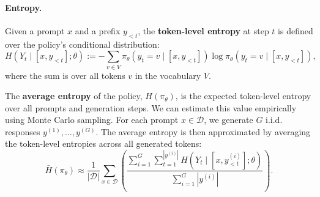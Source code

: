 \paragraph{Entropy.} 
%
Given a prompt $x$ and a prefix $y_{<t}$, the \textbf{token-level entropy} at step $t$ is defined over the policy's conditional distribution:
$$
H(Y_t \mid [x, y_{<t}]; \theta) := -\sum_{v \in V} \pi_\theta(y_t = v \mid [x, y_{<t}]) \log \pi_\theta(y_t = v \mid [x, y_{<t}]),
$$
where the sum is over all tokens $v$ in the vocabulary $V$.

The \textbf{average entropy} of the policy, $H(\pi_\theta)$, is the expected token-level entropy over all prompts and generation steps. We can estimate this value empirically using Monte Carlo sampling. For each prompt $x \in \mathcal{D}$, we generate $G$ i.i.d. responses $y^{(1)}, \dots, y^{(G)}$. The average entropy is then approximated by averaging the token-level entropies across all generated tokens:
$$
\bar{H}(\pi_\theta) \approx \frac{1}{|\mathcal{D}|} \sum_{x \in \mathcal{D}} \left( \frac{\sum_{i=1}^G \sum_{t=1}^{|y^{(i)}|} H(Y_t \mid [x, y^{(i)}_{<t}]; \theta)}{\sum_{i=1}^G |y^{(i)}|} \right).
$$